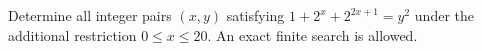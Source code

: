 Determine all integer pairs $(x,y)$ satisfying $ 1+2^x+2^{2x+1}=y^2 $ under the additional restriction $ 0\le x\le20 $. An exact finite search is allowed.
